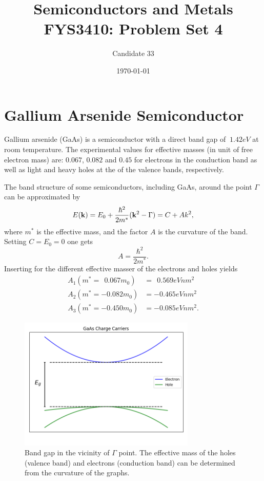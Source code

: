 \documentclass[11pt]{amsart}
\title[Problem Set 4]{Semiconductors and Metals\\
			\hrulefill \small{ FYS3410: Problem Set 4 } \hrulefill}
\author{Candidate 33}
\date{\today}
\begin{document}
\maketitle

\setcounter{section}{2}

\section{Gallium Arsenide Semiconductor}
Gallium arsenide (GaAs) is a semiconductor with a direct band gap of $~1.42eV$ at room temperature. The experimental values for effective masses (in unit of free electron mass) are: $0.067$, $0.082$ and $0.45$ for electrons in the conduction band as well as light and heavy holes at the of the valence bands, respectively. 

The band structure of some semiconductors, including GaAs, around the point $\Gamma$ can be approximated by
\begin{equation}
E(\vb{k}) = E_0 + \frac{\hbar^2}{2m^*}(\vb{k}^2 - \Gamma) = C + Ak^2,
\end{equation}
where $m^*$ is the effective mass, and the factor $A$ is the curvature of the band. Setting $C=E_0=0$ one gets
\begin{equation}
A = \frac{\hbar^2}{2m^*}.
\end{equation}
Inserting for the different effective masser of the electrons and holes yields
\begin{align*}
A_1(m^* = \ \  0.067m_0) &= \ \ 0.569eVnm^2 \\ 
A_2(m^* = -0.082m_0) &= -0.465eVnm^2 \\
A_3(m^* = -0.450m_0) &= -0.085eVnm^2.
\end{align*}

\begin{figure}
\centering
	\includegraphics[width=0.75\textwidth]{problem3.png}
	\caption{Band gap in the vicinity of $\Gamma$ point. The effective mass of the holes (valence band) and electrons (conduction band) can be determined from the curvature of the graphs.}
	\label{fig:problem3}
\end{figure}
\end{document}
